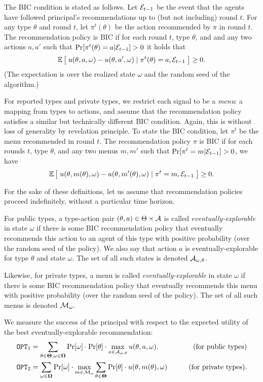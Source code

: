 The BIC condition is stated as follows. Let $\mathcal{E}_{t-1}$ be the event that the agents have followed principal's recommendations up to (but not including) round $t$. For any type $\theta$ and round $t$, let $\pi^t(\theta)$ be the action recommended by $\pi$ in round $t$. The recommendation policy is BIC if for each round $t$, type $\theta$, and and any two actions $a,a'$ such that $\Pr[\pi^t(\theta) = a|\mathcal{E}_{t-1}] > 0$ it holds that
\[
\mathbb{E}\left[\; u(\theta,a,\omega) - u(\theta,a',\omega) \mid \pi^t(\theta) =a, \mathcal{E}_{t-1}\;\right] \geq 0.
\]
(The expectation is over the realized state $\omega$ and the random seed of the algorithm.)

For reported types and private types, we restrict each signal to be a \emph{menu}: a mapping from types to actions, and assume that the recommendation policy satisfies a similar but technically different BIC condition. Again, this is without loss of generality by revelation principle. To state the BIC condition, let $\pi^t$ be the menu recommended in round $t$. The recommendation policy $\pi$ is BIC if for each rounds $t$, type $\theta$, and any two menus $m,m'$ such that
    $\Pr[\pi^t= m|\mathcal{E}_{t-1}] > 0$, we have
\[
\mathbb{E}\left[\; u(\theta,m(\theta),\omega) - u(\theta,m'(\theta),\omega)
    \mid \pi^t = m, \mathcal{E}_{t-1}\;\right] \geq 0.
\]

For the sake of these definitions, let us assume that recommendation policies proceed indefinitely, \ie without a particular time horizon.

For public types, a type-action pair $(\theta,a)\in \Theta\times \mathcal{A}$ is called \emph{eventually-explorable} in state $\omega$ if there is some BIC recommendation policy that eventually recommends this action to an agent of this type with positive probability (over the random seed of the policy). We also say that action $a$ is eventually-explorable for type $\theta$ and state $\omega$. The set of all such states is denoted $\mathcal{A}_{\omega,\theta}$.


Likewise, for private types, a menu is called \emph{eventually-explorable} in state $\omega$ if there is some BIC recommendation policy that eventually recommends this menu with positive probability (over the random seed of the policy). The set of all such menus is denoted $\mathcal{M}_{\omega}$.

We measure the success of the principal with respect to the expected utility of the best eventually-explorable recommendation:
\begin{align*}
\mathtt{OPT}_1 &= \sum_{\theta \in \bold{\Theta}, \omega\in \bold{\Omega}} \Pr[\omega] \cdot \Pr[\theta] \cdot \max_{a \in \mathcal{A}_{\omega,\theta}} u(\theta, a, \omega).
    &\qquad\text{(for public types)}\\
\mathtt{OPT}_2 &= \sum_{\omega\in \bold{\Omega}} \Pr[\omega] \cdot\max_{m \in \mathcal{M}_{\omega}}\sum_{\theta \in \bold{\Theta}} \Pr[\theta] \cdot  u(\theta, m(\theta), \omega)
&\qquad\text{(for private types)}.
\end{align*}

